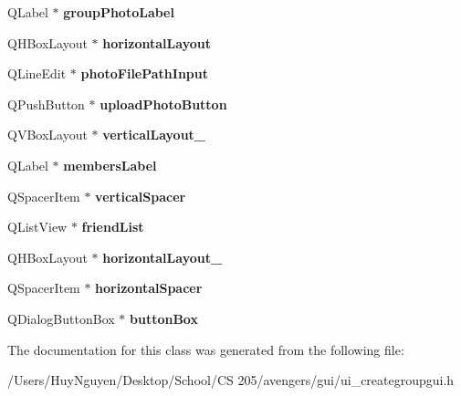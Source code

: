 \begin{DoxyCompactItemize}
\item 
Q\+Label $\ast$ {\bfseries group\+Photo\+Label}\hypertarget{classUi__CreateGroupGUI_a1797e4b629a1fc098edea5754bf7218e}{}\label{classUi__CreateGroupGUI_a1797e4b629a1fc098edea5754bf7218e}

\item 
Q\+H\+Box\+Layout $\ast$ {\bfseries horizontal\+Layout}\hypertarget{classUi__CreateGroupGUI_a8700a9fa40f2eab7913cb65e748da7db}{}\label{classUi__CreateGroupGUI_a8700a9fa40f2eab7913cb65e748da7db}

\item 
Q\+Line\+Edit $\ast$ {\bfseries photo\+File\+Path\+Input}\hypertarget{classUi__CreateGroupGUI_aeb4d7ba0ba9bc1e2698275c09a5117ce}{}\label{classUi__CreateGroupGUI_aeb4d7ba0ba9bc1e2698275c09a5117ce}

\item 
Q\+Push\+Button $\ast$ {\bfseries upload\+Photo\+Button}\hypertarget{classUi__CreateGroupGUI_abf94b22511d5a2dc43077f5d99bb975f}{}\label{classUi__CreateGroupGUI_abf94b22511d5a2dc43077f5d99bb975f}

\item 
Q\+V\+Box\+Layout $\ast$ {\bfseries vertical\+Layout\+\_}\hypertarget{classUi__CreateGroupGUI_ada968dde90a42c625a5766fff0ad507c}{}\label{classUi__CreateGroupGUI_ada968dde90a42c625a5766fff0ad507c}

\item 
Q\+Label $\ast$ {\bfseries members\+Label}\hypertarget{classUi__CreateGroupGUI_a9bb13d0265612effb435110acd4912f2}{}\label{classUi__CreateGroupGUI_a9bb13d0265612effb435110acd4912f2}

\item 
Q\+Spacer\+Item $\ast$ {\bfseries vertical\+Spacer}\hypertarget{classUi__CreateGroupGUI_ad9676fe2c8be809b9a0b5c3c4e5c3bfd}{}\label{classUi__CreateGroupGUI_ad9676fe2c8be809b9a0b5c3c4e5c3bfd}

\item 
Q\+List\+View $\ast$ {\bfseries friend\+List}\hypertarget{classUi__CreateGroupGUI_ab60f80b5d33942e298f044dbb1c31a93}{}\label{classUi__CreateGroupGUI_ab60f80b5d33942e298f044dbb1c31a93}

\item 
Q\+H\+Box\+Layout $\ast$ {\bfseries horizontal\+Layout\+\_}\hypertarget{classUi__CreateGroupGUI_afb2b1930a8891a4ea87023f0d95d126e}{}\label{classUi__CreateGroupGUI_afb2b1930a8891a4ea87023f0d95d126e}

\item 
Q\+Spacer\+Item $\ast$ {\bfseries horizontal\+Spacer}\hypertarget{classUi__CreateGroupGUI_ac7dbeb4f6cd072ee0a665fb3d5bfe12d}{}\label{classUi__CreateGroupGUI_ac7dbeb4f6cd072ee0a665fb3d5bfe12d}

\item 
Q\+Dialog\+Button\+Box $\ast$ {\bfseries button\+Box}\hypertarget{classUi__CreateGroupGUI_a692422c650ca1fb0745a78068b9d595c}{}\label{classUi__CreateGroupGUI_a692422c650ca1fb0745a78068b9d595c}

\end{DoxyCompactItemize}


The documentation for this class was generated from the following file\+:\begin{DoxyCompactItemize}
\item 
/\+Users/\+Huy\+Nguyen/\+Desktop/\+School/\+C\+S 205/avengers/gui/ui\+\_\+creategroupgui.\+h\end{DoxyCompactItemize}
